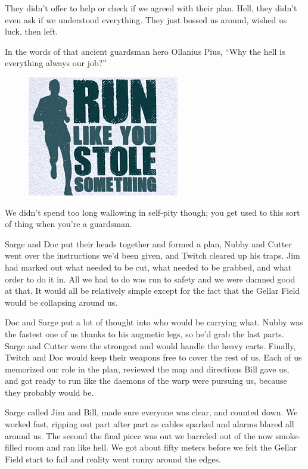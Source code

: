 They didn’t offer to help or check if we agreed with their plan. 
Hell, they didn’t even ask if we understood everything. 
They just bossed us around, wished us luck, then left.

In the words of that ancient guardsman hero Ollanius Pius, “Why the hell is everything always our job?”

\begin{figure}
	\begin{center}
		\includegraphics[width=\figwidth]{pics/7/32.png}
	\end{center}
\end{figure}
We didn’t spend too long wallowing in self-pity though; 
you get used to this sort of thing when you’re a guardsman. 


Sarge and Doc put their heads together and formed a plan, Nubby and Cutter went over the instructions we’d been given, and Twitch cleared up his traps. 
Jim had marked out what needed to be cut, what needed to be grabbed, and what order to do it in. 
All we had to do was run to safety and we were damned good at that. 
It would all be relatively simple except for the fact that the Gellar Field would be collapsing around us.

Doc and Sarge put a lot of thought into who would be carrying what. 
Nubby was the fastest one of us thanks to his augmetic legs, so he’d grab the last parts. 
Sarge and Cutter were the strongest and would handle the heavy carts. 
Finally, Twitch and Doc would keep their weapons free to cover the rest of us. 
Each of us memorized our role in the plan, reviewed the map and directions Bill gave us, and got ready to run like the daemons of the warp were pursuing us, because they probably would be.

Sarge called Jim and Bill, made sure everyone was clear, and counted down. 
We worked fast, ripping out part after part as cables sparked and alarms blared all around us. 
The second the final piece was out we barreled out of the now smoke-filled room and ran like hell. 
We got about fifty meters before we felt the Gellar Field start to fail and reality went runny around the edges.

